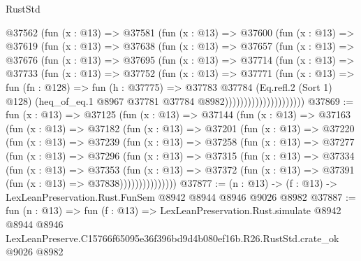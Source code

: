 \begin{lexlean}{RustStd}
\begin{coremodule}
                  @37562
                    (fun (x : @13) =>
                    @37581
                      (fun (x : @13) =>
                      @37600
                        (fun (x : @13) =>
                        @37619
                          (fun (x : @13) =>
                          @37638
                            (fun (x : @13) =>
                            @37657
                              (fun (x : @13) =>
                              @37676
                                (fun (x : @13) =>
                                @37695
                                  (fun (x : @13) =>
                                  @37714
                                    (fun (x : @13) =>
                                    @37733
                                      (fun (x : @13) =>
                                      @37752
                                        (fun (x : @13) =>
                                        @37771
                                          (fun (x : @13) =>
                                          fun (fn : @128) =>
                                          fun (h : @37775) =>
                                          @37783
                                            @37784
                                            (Eq.refl.{2} (Sort 1) @128)
                                            (heq_of_eq.{1}
                                              @8967
                                              @37781
                                              @37784
                                              @8982)))))))))))))))))))))
@37869 := fun (x : @13) =>
  @37125
    (fun (x : @13) =>
    @37144
      (fun (x : @13) =>
      @37163
        (fun (x : @13) =>
        @37182
          (fun (x : @13) =>
          @37201
            (fun (x : @13) =>
            @37220
              (fun (x : @13) =>
              @37239
                (fun (x : @13) =>
                @37258
                  (fun (x : @13) =>
                  @37277
                    (fun (x : @13) =>
                    @37296
                      (fun (x : @13) =>
                      @37315
                        (fun (x : @13) =>
                        @37334
                          (fun (x : @13) =>
                          @37353
                            (fun (x : @13) =>
                            @37372 (fun (x : @13) => @37391 (fun (x : @13) => @37838)))))))))))))))
@37877 := (n : @13) -> (f : @13) -> LexLeanPreservation.Rust.FunSem @8942 @8944 @8946 @9026 @8982
@37887 := fun (n : @13) =>
  fun (f : @13) =>
  LexLeanPreservation.Rust.simulate
    @8942
    @8944
    @8946
    LexLeanPreserve.C15766f65095e36f396bd9d4b080ef16b.R26.RustStd.crate_ok
    @9026
    @8982
\end{coremodule}
\end{lexlean}
